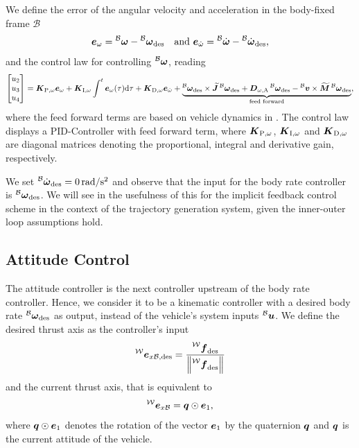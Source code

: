 We define the error of the angular velocity and acceleration in the body-fixed frame $\mathcal{B}$
\begin{equation}
	\vangerror = \vangbody - \vangdesiredbody \quad \text{and }
	\aangerror = \aangbody - \aangdesiredbody
	,
\end{equation}
and the control law for controlling $\prescript{\mathcal{B}}{}{\mbox{$\bm{\omega}$}}$, reading
\begin{equation}
	\begin{bmatrix}
		u_2 \\ u_3 \\ u_4
	\end{bmatrix}
	=
	\KpBodyRate \vangerror
	+ \KiBodyRate \int_{}^{t} \vangerror(\tau)\text{d}\tau
	+ \KdBodyRate \aangerror
	+\underbrace{
		\vangdesiredbody \times \Jbs \vangdesiredbody
		+ \Domegaadded \vangdesiredbody
		- \vlinbody \times \Mbs \vangdesiredbody
	}_{\text{feed forward}}
	,
\end{equation}
where the feed forward terms are based on vehicle dynamics in . The control law displays a PID-Controller with feed forward term, where $\mbox{$\bm{K}$}_{\text{P},\omega}$, $\mbox{$\bm{K}$}_{\text{I},\omega}$ and $\mbox{$\bm{K}$}_{\text{D},\omega}$ are diagonal matrices denoting the proportional, integral and derivative gain, respectively.

We set $\aangdesiredbody = \unit[0]{rad/s^2}$ and observe that the input for the body rate controller is $\vangdesiredbody$. We will see in  the usefulness of this for the implicit feedback control scheme in the context of the trajectory generation system, given the inner-outer loop assumptions hold.

\subsection{Attitude Control}
The attitude controller is the next controller upstream of the body rate controller. Hence, we consider it to be a kinematic controller with a desired body rate $\vangdesiredbody$ as output, instead of the vehicle's system inputs $\prescript{\mathcal{B}}{}{\mbox{$\bm{u}$}}$. We define the desired thrust axis as the controller's input 
\begin{equation}
	\exdesiredbodyinworld =
	\frac{\thrustdesiredworld}{
		\left\lVert\thrustdesiredworld\right\rVert
	}
\end{equation}
and the current thrust axis, that is equivalent to 
\begin{equation}
	\prescript{\mathcal{W}}{}{\mbox{$\bm{e}$}}_{x\mathcal{B}} = \mbox{$\bm{q}$} \odot \mbox{$\bm{e}$}_1
	,
\end{equation}
where $\mbox{$\bm{q}$} \odot \mbox{$\bm{e}$}_1$ denotes the rotation of the vector $\mbox{$\bm{e}$}_1$ by the quaternion $\mbox{$\bm{q}$}$ and $\mbox{$\bm{q}$}$ is the current attitude of the vehicle.

